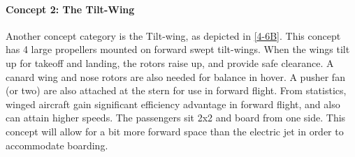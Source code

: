 \paragraph{Concept 2: The Tilt-Wing}
Another concept category is the Tilt-wing, as depicted in \autoref{4-6B}. This concept has 4 large propellers mounted on forward swept tilt-wings. When the wings tilt up for takeoff and landing, the rotors raise up, and provide safe clearance. A canard wing and nose rotors are also needed for balance in hover. A pusher fan (or two) are also attached at the stern for use in forward flight. From statistics, winged aircraft gain significant efficiency advantage in forward flight, and also can attain higher speeds. The passengers sit 2x2 and board from one side. This concept will allow for a bit more forward space than the electric jet in order to accommodate boarding.

